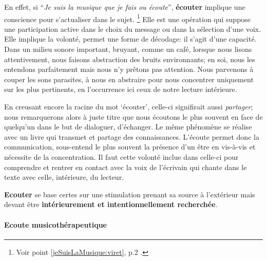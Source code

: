 En effet, si \enquote{\emph{Je suis la musique que je fais ou écoute}}\autocite{viret:b}, \textbf{écouter} implique 
une conscience pour s'actualiser dans le sujet. \footnote{Voir point
  \ref{jeSuisLaMusique:viret}, p.2 \pageref{jeSuisLaMusique:viret}.}
Elle est une opération 
qui suppose une participation active dans le choix du message
ou dans la sélection d'une voix. Elle  implique la volonté,
permet une forme de décodage: il s'agit d'une capacité.
Dans un milieu sonore important,
 bruyant, comme un café, lorsque nous lisons attentivement, nous faisons abstraction
des bruits environnants; en soi, nous les entendons parfaitement mais nous n'y
prêtons pas attention. Nous parvenons à couper les sons parasites, à nous en abstraire pour
nous concentrer uniquement sur les plus  pertinents, en l'occurrence
ici ceux de notre lecture intérieure.




  En creusant encore la racine du mot `écouter', celle-ci signifirait aussi \emph{partager}; nous
  remarquerons alors à juste titre que nous écoutons le plus souvent en
  face de quelqu'un dans le but de dialoguer, d'échanger. Le même
  phénomène se réalise avec un livre qui transmet et partage des
  connaissances. L'écoute permet donc la communication, sous-entend le
  plus souvent la présence d'un être en vis-à-vis et nécessite de la
  concentration. Il faut cette volonté inclue dans celle-ci  pour
  comprendre et rentrer en contact avec la voix de  l'écrivain qui
  chante dans le texte avec celle, intérieure, du lecteur.

  
 \textbf{Ecouter} se base certes sur une stimulation prenant sa source à 
l'extérieur mais devant être \textbf{ intérieurement et intentionnellement
	recherchée}.




      \paragraph{Ecoute musicothérapeutique}
      

